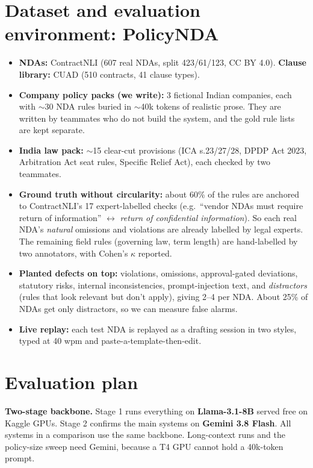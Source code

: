 \documentclass[11pt,a4paper]{article}
\begin{document}
\section{Dataset and evaluation environment: PolicyNDA}
\begin{itemize}
\item \textbf{NDAs:} ContractNLI (607 real NDAs, split 423/61/123, CC BY 4.0). \textbf{Clause library:} CUAD (510 contracts, 41 clause types).
\item \textbf{Company policy packs (we write):} 3 fictional Indian companies, each with $\sim$30 NDA rules buried in $\sim$40k tokens of realistic prose. They are written by teammates who do not build the system, and the gold rule lists are kept separate.
\item \textbf{India law pack:} $\sim$15 clear-cut provisions (ICA s.23/27/28, DPDP Act 2023, Arbitration Act seat rules, Specific Relief Act), each checked by two teammates.
\item \textbf{Ground truth without circularity:} about 60\% of the rules are anchored to ContractNLI's 17 expert-labelled checks (e.g.\ ``vendor NDAs must require return of information'' $\leftrightarrow$ \emph{return of confidential information}). So each real NDA's \emph{natural} omissions and violations are already labelled by legal experts. The remaining field rules (governing law, term length) are hand-labelled by two annotators, with Cohen's $\kappa$ reported.
\item \textbf{Planted defects on top:} violations, omissions, approval-gated deviations, statutory risks, internal inconsistencies, prompt-injection text, and \emph{distractors} (rules that look relevant but don't apply), giving 2--4 per NDA. About 25\% of NDAs get only distractors, so we can measure false alarms.
\item \textbf{Live replay:} each test NDA is replayed as a drafting session in two styles, typed at 40 wpm and paste-a-template-then-edit.
\end{itemize}

\section{Evaluation plan}
\textbf{Two-stage backbone.} Stage 1 runs everything on \textbf{Llama-3.1-8B} served free on Kaggle GPUs. Stage 2 confirms the main systems on \textbf{Gemini 3.8 Flash}. All systems in a comparison use the same backbone. Long-context runs and the policy-size sweep need Gemini, because a T4 GPU cannot hold a 40k-token prompt.
\end{document}
